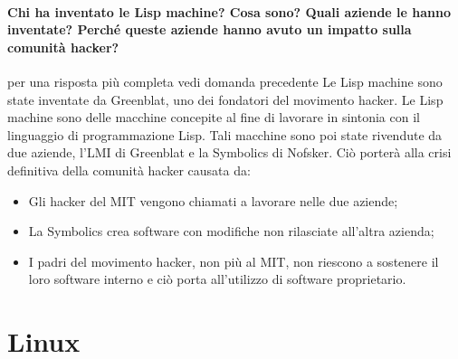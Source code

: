\documentclass[a4paper]{article}
\begin{document}
		\paragraph{Chi ha inventato le Lisp machine? Cosa sono? Quali aziende le hanno inventate? Perché queste aziende hanno avuto un impatto sulla comunità hacker?}
		{per una risposta più completa vedi domanda precedente}
		Le Lisp machine sono state inventate da Greenblat, uno dei fondatori del movimento hacker. Le Lisp machine sono delle macchine concepite al fine di lavorare in sintonia con il linguaggio di programmazione Lisp. Tali macchine sono poi state rivendute da due aziende, l'LMI di Greenblat e la Symbolics di Nofsker. Ciò porterà alla crisi definitiva della comunità hacker causata da:
		\begin{itemize}
			\item Gli hacker del MIT vengono chiamati a lavorare nelle due aziende;
			\item La Symbolics crea software con modifiche non rilasciate all'altra azienda;
			\item I padri del movimento hacker, non più al MIT, non riescono a sostenere il loro software interno e ciò porta all'utilizzo di software proprietario.
		\end{itemize}

	\section{Linux}
		
\end{document}
